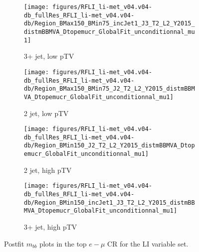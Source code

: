 \begin{figure}[!htbp]\captionsetup{justification=centering}
    \centering
\begin{subfigure}[t]{0.45000\textwidth}\centering\texttt{[image: figures/RFLI\_li-met\_v04.v04-db\_fullRes\_RFLI\_li-met\_v04.v04-db/Region\_BMax150\_BMin75\_incJet1\_J3\_T2\_L2\_Y2015\_distmBBMVA\_Dtopemucr\_GlobalFit\_unconditionnal\_mu1]}\caption{3+ jet, low pTV}\end{subfigure}
\begin{subfigure}[t]{0.45000\textwidth}\centering\texttt{[image: figures/RFLI\_li-met\_v04.v04-db\_fullRes\_RFLI\_li-met\_v04.v04-db/Region\_BMax150\_BMin75\_J2\_T2\_L2\_Y2015\_distmBBMVA\_Dtopemucr\_GlobalFit\_unconditionnal\_mu1]}\caption{2 jet, low pTV}\end{subfigure}
\begin{subfigure}[t]{0.45000\textwidth}\centering\texttt{[image: figures/RFLI\_li-met\_v04.v04-db\_fullRes\_RFLI\_li-met\_v04.v04-db/Region\_BMin150\_J2\_T2\_L2\_Y2015\_distmBBMVA\_Dtopemucr\_GlobalFit\_unconditionnal\_mu1]}\caption{2 jet, high pTV}\end{subfigure}
\begin{subfigure}[t]{0.45000\textwidth}\centering\texttt{[image: figures/RFLI\_li-met\_v04.v04-db\_fullRes\_RFLI\_li-met\_v04.v04-db/Region\_BMin150\_incJet1\_J3\_T2\_L2\_Y2015\_distmBBMVA\_Dtopemucr\_GlobalFit\_unconditionnal\_mu1]}\caption{3+ jet, high pTV}\end{subfigure}
  \caption{Postfit $m_{bb}$ plots in the top $e-\mu$ CR for the LI variable set.}
  \label{fig:LIPostfittopemuvz}
\end{figure}

